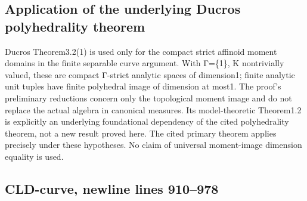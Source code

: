 \documentclass[
  10pt,
]{article}
\begin{document}
\subsection{Application of the underlying Ducros polyhedrality
theorem}\label{application-of-the-underlying-ducros-polyhedrality-theorem}

Ducros Theorem3.2(1) is used only for the compact strict affinoid moment
domains in the finite separable curve argument. With Γ=\{1\}, K
nontrivially valued, these are compact Γ-strict analytic spaces of
dimension1; finite analytic unit tuples have finite polyhedral image of
dimension at most1. The proof's preliminary reductions concern only the
topological moment image and do not replace the actual algebra in
canonical measures. Its model-theoretic Theorem1.2 is explicitly an
underlying foundational dependency of the cited polyhedrality theorem,
not a new result proved here. The cited primary theorem applies
precisely under these hypotheses. No claim of universal moment-image
dimension equality is used.

\subsection{CLD-curve, newline lines
910--978}\label{cld-curve-newline-lines-910978}
\end{document}
